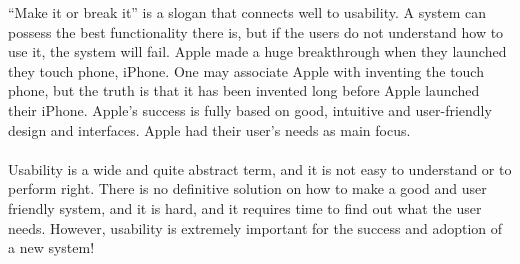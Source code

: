 “Make it or break it” is a slogan that connects well to usability. A system can possess the best functionality there is, but if the users do not understand how to use it, the system will fail. Apple made a huge breakthrough when they launched they touch phone, iPhone. One may associate Apple with inventing the touch phone, but the truth is that it has been invented long before Apple launched their iPhone. Apple’s success is fully based on good, intuitive and user-friendly design and interfaces. Apple had their user’s needs as main focus. \\ \\       
Usability is a wide and quite abstract term, and it is not easy to understand or to perform right. There is no definitive solution on how to make a good and user friendly system, and it is hard, and it requires time to find out what the user needs. However, usability is extremely important for the success and adoption of a new system!